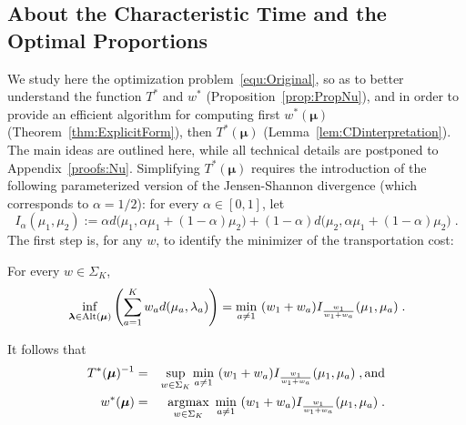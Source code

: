 \documentclass{colt2016} %
\begin{document}
\subsection{About the Characteristic Time and the Optimal Proportions}
We study here the optimization problem~\eqref{equ:Original}, so as to better understand the function $T^*$ and $w^*$ (Proposition~\ref{prop:PropNu}), and in order to provide an efficient algorithm for computing first $w^*(\bm\mu)$ (Theorem~\ref{thm:ExplicitForm}), then $T^*(\bm\mu)$ (Lemma~\ref{lem:CDinterpretation}). The main ideas are outlined here, while all technical details are postponed to Appendix~\ref{proofs:Nu}. 
Simplifying $T^*(\bm \mu)$ requires the introduction of the following parameterized version of the Jensen-Shannon divergence (which corresponds to $\alpha=1/2$): for every $\alpha\in[0,1]$, let
\begin{equation}I_\alpha(\mu_1,\mu_2):=\alpha d\big(\mu_1,\alpha\mu_1 + (1-\alpha)\mu_2\big) + (1-\alpha)d\big(\mu_2,\alpha\mu_1 + (1-\alpha)\mu_2\big)\;.\label{def:Divergences}\end{equation}
The first step is, for any $w$, to identify the minimizer of the transportation cost: 
\begin{lemma}\label{lem:CDinterpretation} For every $w\in \Sigma_K$,
\[ \inf_{\bm\lambda \in \Alt(\bm \mu)} \left(\sum_{a=1}^{K} w_ad(\mu_a,\lambda_a)\right) = \min_{a \neq 1} \ (w_1 + w_a)I_{\frac{w_1}{w_1+w_a}}(\mu_1,\mu_a)\;.\]
\end{lemma}
It follows that 
\begin{eqnarray*}T^*(\bm\mu)^{-1} 
 & = & \sup_{w \in \Sigma_K} \min_{a \neq 1} \ (w_1 + w_a)I_{\frac{w_1}{w_1+w_a}}(\mu_1,\mu_a)\; ,\hbox{and} \\
w^*(\bm\mu) & = & \argmax{w \in \Sigma_K} \ \min_{a \neq 1} \ (w_1 + w_a)I_{\frac{w_1}{w_1+w_a}}(\mu_{1},\mu_a)\;.
\end{eqnarray*}
\end{document}
